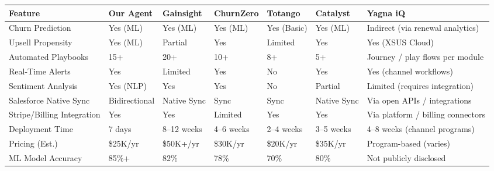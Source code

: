 \documentclass[12pt,a4paper]{article}
\begin{document}
\begin{longtable}{|p{2.6cm}|p{1.8cm}|p{2.0cm}|p{2.0cm}|p{2.0cm}|p{2.0cm}|p{2.5cm}|}
\hline
\textbf{Feature} & \textbf{Our Agent} & \textbf{Gainsight} & \textbf{ChurnZero} & \textbf{Totango} & \textbf{Catalyst} & \textbf{Yagna iQ} \\
\hline
Churn Prediction & Yes (ML) & Yes (ML) & Yes (ML) & Yes (Basic) & Yes (ML) & Indirect (via renewal analytics) \\
\hline
Upsell Propensity & Yes (ML) & Partial & Yes & Limited & Yes & Yes (XSUS Cloud) \\
\hline
Automated Playbooks & 15+ & 20+ & 10+ & 8+ & 5+ & Journey / play flows per module \\
\hline
Real-Time Alerts & Yes & Limited & Yes & No & Yes & Yes (channel workflows) \\
\hline
Sentiment Analysis & Yes (NLP) & Yes & Yes & No & Partial & Limited (requires integration) \\
\hline
Salesforce Native Sync & Bidirectional & Native Sync & Sync & Sync & Native Sync & Via open APIs / integrations \\
\hline
Stripe/Billing Integration & Yes & Yes & Limited & Yes & Yes & Via platform / billing connectors \\
\hline
Deployment Time & 7 days & 8--12 weeks & 4--6 weeks & 2--4 weeks & 3--5 weeks & 4--8 weeks (channel programs) \\
\hline
Pricing (Est.) & \$25K/yr & \$50K+/yr & \$30K/yr & \$20K/yr & \$35K/yr & Program-based (varies) \\
\hline
ML Model Accuracy & 85\%+ & 82\% & 78\% & 70\% & 80\% & Not publicly disclosed \\
\hline
\end{longtable}
\normalsize
\end{document}
